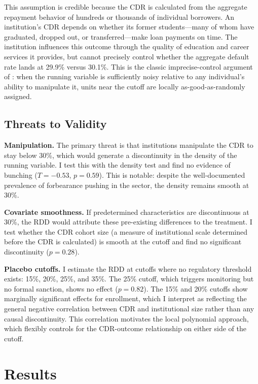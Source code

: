 \documentclass[12pt]{article}
\begin{document}
This assumption is credible because the CDR is calculated from the aggregate repayment behavior of hundreds or thousands of individual borrowers. An institution's CDR depends on whether its former students---many of whom have graduated, dropped out, or transferred---make loan payments on time. The institution influences this outcome through the quality of education and career services it provides, but cannot precisely control whether the aggregate default rate lands at 29.9\% versus 30.1\%. This is the classic imprecise-control argument of \citet{lee2008}: when the running variable is sufficiently noisy relative to any individual's ability to manipulate it, units near the cutoff are locally as-good-as-randomly assigned.

\subsection{Threats to Validity}

\textbf{Manipulation.} The primary threat is that institutions manipulate the CDR to stay below 30\%, which would generate a discontinuity in the density of the running variable. I test this with the \citet{cattaneo2020density} density test and find no evidence of bunching ($T=-0.53$, $p=0.59$). This is notable: despite the well-documented prevalence of forbearance pushing in the sector, the density remains smooth at 30\%.

\textbf{Covariate smoothness.} If predetermined characteristics are discontinuous at 30\%, the RDD would attribute these pre-existing differences to the treatment. I test whether the CDR cohort size (a measure of institutional scale determined before the CDR is calculated) is smooth at the cutoff and find no significant discontinuity ($p=0.28$).

\textbf{Placebo cutoffs.} I estimate the RDD at cutoffs where no regulatory threshold exists: 15\%, 20\%, 25\%, and 35\%. The 25\% cutoff, which triggers monitoring but no formal sanction, shows no effect ($p=0.82$). The 15\% and 20\% cutoffs show marginally significant effects for enrollment, which I interpret as reflecting the general negative correlation between CDR and institutional size rather than any causal discontinuity. This correlation motivates the local polynomial approach, which flexibly controls for the CDR-outcome relationship on either side of the cutoff.


\section{Results}
\end{document}
